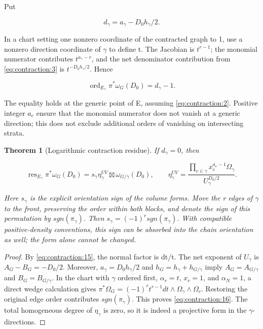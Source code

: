 \documentclass[11pt,a4paper,oneside]{article}
\theoremstyle{plain}
\newtheorem{theorem}{Theorem}[section]
\theoremstyle{definition}
\theoremstyle{remark}
\numberwithin{equation}{section}
\begin{document}
Put

\begin{equation}
d_\gamma=a_\gamma-D_0h_\gamma/2.        \label{eq:contraction:14}
\end{equation}

In a chart setting one nonzero coordinate of the contracted graph to 1, use a nonzero direction coordinate of \(\gamma \) to define t. The Jacobian is \(t^{r- 1}\); the monomial numerator contributes \(t^{a_\gamma - r}\), and the net denominator contribution from \eqref{eq:contraction:3} is \(t^{- D_0h_\gamma /2}\). Hence

\begin{equation}
\operatorname{ord}_{E_\gamma}\pi^*\omega_G(D_0)
                                  =d_\gamma-1.                 \label{eq:contraction:15}
\end{equation}

The equality holds at the generic point of E, assuming \eqref{eq:contraction:2}. Positive integer \(a_e\) ensure that the monomial numerator does not vanish at a generic direction; this does not exclude additional orders of vanishing on intersecting strata.

\begin{theorem}[Logarithmic contraction residue]

\label{thm:contraction:4.1} If \(d_\gamma =0\), then

\begin{equation}
\operatorname{res}_{E_\gamma}\pi^*\omega_G(D_0)
       =s_\gamma\eta_\gamma^{UV}\boxtimes\omega_{G/\gamma}(D_0),\qquad
 \eta_\gamma^{UV}=\frac{\prod_{e\in\gamma}x_e^{a_e-1}\Omega_\gamma}
                                      {U_\gamma^{D_0/2}}.        \label{eq:contraction:16}
\end{equation}

Here \(s_\gamma \) is the explicit orientation sign of the volume forms. Move the r edges of \(\gamma \) to the front, preserving the order within both blocks, and denote the sign of this permutation by \(sgn(\pi _\gamma )\). Then \(s_\gamma =(- 1)^r sgn(\pi _\gamma )\). With compatible positive-density conventions, this sign can be absorbed into the chain orientation as well; the form alone cannot be changed.

\end{theorem}

\begin{proof}

By \eqref{eq:contraction:15}, the normal factor is dt/t. The net exponent of \(U_\gamma \) is \(A_G- B_G=- D_0/2\). Moreover, \(a_\gamma =D_0h_\gamma /2\) and \(h_G=h_\gamma +h_{G/\gamma }\) imply \(A_G=A_{G/\gamma }\) and \(B_G=B_{G/\gamma }\). In the chart with \(\gamma \) ordered first, \(\alpha _r=t\), \(x_r=1\), and \(\alpha _N=1\), a direct wedge calculation gives \(\pi^*\Omega _G=(- 1)^r t^{r- 1}dt\wedge \Omega _\gamma \wedge \Omega _c\). Restoring the original edge order contributes \(sgn(\pi _\gamma )\). This proves \eqref{eq:contraction:16}. The total homogeneous degree of \(\eta _\gamma \) is zero, so it is indeed a projective form in the \(\gamma \)-directions.

\end{proof}
\end{document}
